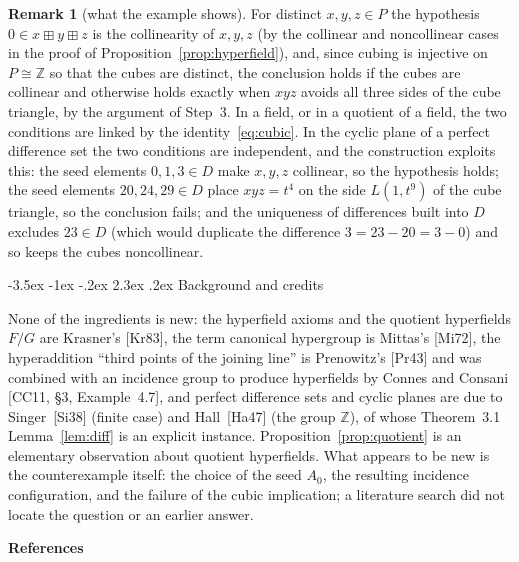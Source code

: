 \documentclass[12pt]{article}
\makeatletter
\renewcommand\section{\@startsection{section}{1}{\z@}%
  {-3.5ex \@plus -1ex \@minus -.2ex}%
  {2.3ex \@plus.2ex}%
  {\normalfont\bfseries}}
\theoremstyle{plain}
\theoremstyle{definition}
\newtheorem{remark}[theorem]{Remark}
\newcommand{\Z}{\mathbb{Z}}
\newcommand{\bp}{\boxplus}
\makeatother
\begin{document}
\begin{remark}[what the example shows]
For distinct $x,y,z\in P$ the hypothesis $0\in x\bp y\bp z$ is the
collinearity of $x,y,z$ (by the collinear and noncollinear cases in the
proof of Proposition~\ref{prop:hyperfield}), and, since cubing is
injective on $P\cong\Z$ so that the cubes are distinct, the conclusion
holds if the cubes are collinear and otherwise holds exactly when $xyz$
avoids all three sides of the cube triangle, by the argument of
Step~3.  In a field,
or in a quotient of a field, the two conditions are linked by the
identity~\eqref{eq:cubic}.  In the cyclic plane of a perfect difference
set the two conditions are independent, and the construction exploits
this: the seed elements $0,1,3\in D$ make $x,y,z$ collinear, so the
hypothesis holds; the seed elements $20,24,29\in D$ place $xyz=t^4$ on
the side $L(1,t^9)$ of the cube triangle, so the conclusion fails; and
the uniqueness of differences built into $D$ excludes $23\in D$ (which
would duplicate the difference $3=23-20=3-0$) and so keeps the cubes
noncollinear.
\end{remark}

\section{Background and credits}\label{sec:credits}

None of the ingredients is new: the hyperfield axioms and the quotient
hyperfields $F/G$ are Krasner's [Kr83], the term canonical hypergroup
is Mittas's [Mi72], the hyperaddition ``third points of the joining
line'' is Prenowitz's [Pr43] and was combined with an incidence group
to produce hyperfields by Connes and Consani [CC11, \S3, Example~4.7],
and perfect difference sets and cyclic planes are due to Singer~[Si38]
(finite case) and Hall~[Ha47] (the group $\Z$), of whose Theorem~3.1
Lemma~\ref{lem:diff} is an explicit instance.
Proposition~\ref{prop:quotient} is an elementary observation about
quotient hyperfields.  What appears to be new is the counterexample
itself: the choice of the seed $A_0$, the resulting incidence
configuration, and the failure of the cubic implication; a literature
search did not locate the question or an earlier answer.

\medskip
\noindent\textbf{References}
\end{document}
